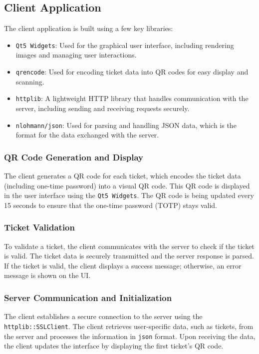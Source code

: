 \subsection{Client Application}
The client application is built using a few key libraries:
\begin{itemize}
    \item \texttt{Qt5 Widgets}: Used for the graphical user interface, including rendering images and managing user interactions.
    \item \texttt{qrencode}: Used for encoding ticket data into QR codes for easy display and scanning.
    \item \texttt{httplib}: A lightweight HTTP library that handles communication with the server, including sending and receiving requests securely.
    \item \texttt{nlohmann/json}: Used for parsing and handling JSON data, which is the format for the data exchanged with the server.
\end{itemize}

\subsubsection{QR Code Generation and Display}
The client generates a QR code for each ticket, which encodes the ticket data (including one-time password) into a visual QR code. This QR code is displayed in the user interface using the \texttt{Qt5 Widgets}.
The QR code is being updated every 15 seconds to ensure that the one-time password (TOTP) stays valid.

\subsubsection{Ticket Validation}
To validate a ticket, the client communicates with the server to check if the ticket is valid. The ticket data is securely transmitted and the server response is parsed. If the ticket is valid, the client displays a success message; otherwise, an error message is shown on the UI.

\subsubsection{Server Communication and Initialization}
The client establishes a secure connection to the server using the \texttt{httplib::SSLClient}. The client retrieves user-specific data, such as tickets, from the server and processes the information in \texttt{json} format. Upon receiving the data, the client updates the interface by displaying the first ticket’s QR code.

